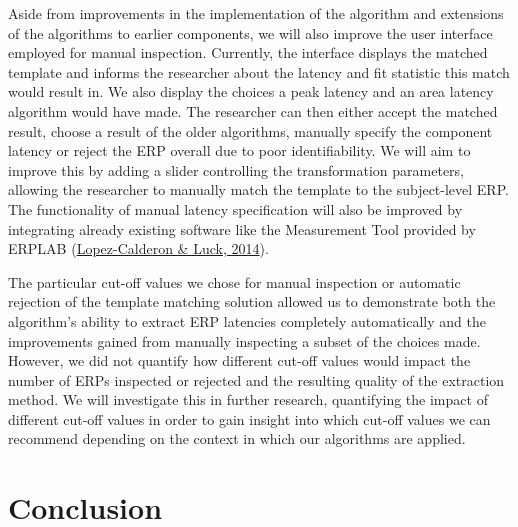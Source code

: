 \documentclass[
  man]{apa7}
\begin{document}
Aside from improvements in the implementation of the algorithm and extensions of the algorithms to earlier components, we will also improve the user interface employed for manual inspection. Currently, the interface displays the matched template and informs the researcher about the latency and fit statistic this match would result in. We also display the choices a peak latency and an area latency algorithm would have made. The researcher can then either accept the matched result, choose a result of the older algorithms, manually specify the component latency or reject the ERP overall due to poor identifiability. We will aim to improve this by adding a slider controlling the transformation parameters, allowing the researcher to manually match the template to the subject-level ERP. The functionality of manual latency specification will also be improved by integrating already existing software like the Measurement Tool provided by ERPLAB (\protect\hyperlink{ref-lopez2014erplab}{Lopez-Calderon \& Luck, 2014}).

The particular cut-off values we chose for manual inspection or automatic rejection of the template matching solution allowed us to demonstrate both the algorithm's ability to extract ERP latencies completely automatically and the improvements gained from manually inspecting a subset of the choices made. However, we did not quantify how different cut-off values would impact the number of ERPs inspected or rejected and the resulting quality of the extraction method. We will investigate this in further research, quantifying the impact of different cut-off values in order to gain insight into which cut-off values we can recommend depending on the context in which our algorithms are applied.

\hypertarget{conclusion}{%
\section{Conclusion}\label{conclusion}}
\end{document}
